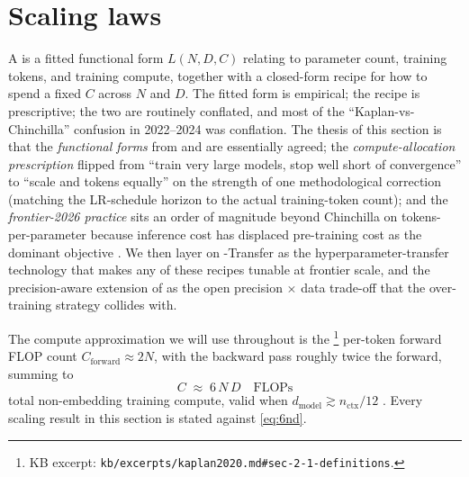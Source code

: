 
\section{Scaling laws}
\label{sec:scaling-laws}

A  is a fitted functional form $L(N, D, C)$ relating
 to parameter count, training tokens, and training
compute, together with a closed-form recipe for how to spend a fixed
$C$ across $N$ and $D$. The fitted form is empirical; the recipe is
prescriptive; the two are routinely conflated, and most of the
``Kaplan-vs-Chinchilla'' confusion in 2022--2024 was conflation. The
thesis of this section is that the \emph{functional forms} from
\citet{kaplan2020} and \citet{hoffmann2022-chinchilla} are essentially
agreed; the \emph{compute-allocation prescription} flipped from
``train very large models, stop well short of convergence''
\citep[\S 1.1]{kaplan2020} to ``scale  and tokens equally''
\citep[\S 3.4]{hoffmann2022-chinchilla} on the strength of one
methodological correction (matching the LR-schedule horizon to the
actual training-token count); and the \emph{frontier-2026 practice}
sits an order of magnitude beyond Chinchilla on tokens-per-parameter
because inference cost has displaced pre-training cost as the dominant
objective \citep[\S 3.2]{deepseek-v3}. We then layer on
\textmu-Transfer \citep{yang2022-mup} as the hyperparameter-transfer
technology that makes any of these recipes tunable at frontier scale,
and the precision-aware extension of
\citet{scaling-laws-precision-2024} as the open precision $\times$ data
trade-off that the over-training strategy collides with.

The compute approximation we will use throughout is the
\citet[\S 2.1, eq.\ 2.1]{kaplan2020}\footnote{KB excerpt:
\nolinkurl{kb/excerpts/kaplan2020.md#sec-2-1-definitions}.} per-token
forward FLOP count $C_{\text{forward}} \approx 2N$, with the backward
pass roughly twice the forward, summing to
\begin{equation}
C \;\approx\; 6\,N\,D \quad \text{FLOPs}
\label{eq:6nd}
\end{equation}
total non-embedding training compute, valid when $d_{\text{model}}
\gtrsim n_{\text{ctx}}/12$ \citep[\S 2.1]{kaplan2020}. Every scaling
result in this section is stated against \cref{eq:6nd}.

